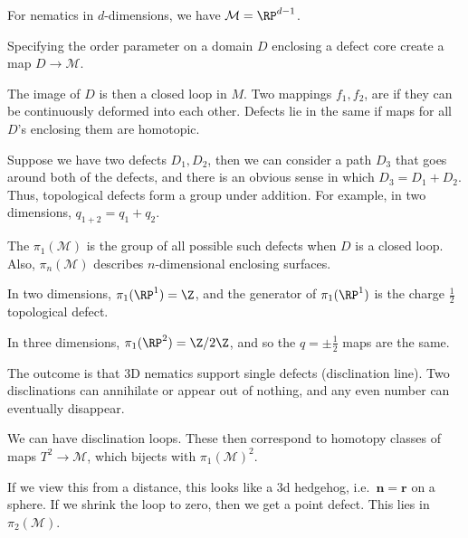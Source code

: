 \documentclass[a4paper]{article}
\begin{document}
\begin{eg}
  For nematics in $d$-dimensions, we have $\mathcal{M} = \RP^{d - 1}$.
\end{eg}

Specifying the order parameter on a domain $D$ enclosing a defect core create a map $D \to \mathcal{M}$.

The image of $D$ is then a closed loop in $M$. Two mappings $f_1, f_2$, are  if they can be continuously deformed into each other. Defects lie in the same  if maps for all $D$'s enclosing them are homotopic.

Suppose we have two defects $D_1, D_2$, then we can consider a path $D_3$ that goes around both of the defects, and there is an obvious sense in which $D_3 = D_1 + D_2$.  Thus, topological defects form a group under addition. For example, in two dimensions, $q_{1 + 2} = q_1 + q_2$.

The  $\pi_1(\mathcal{M})$ is the group of all possible such defects when $D$ is a closed loop. Also, $\pi_n(\mathcal{M})$  describes $n$-dimensional enclosing surfaces.

\begin{eg}
  In two dimensions, $\pi_1(\RP^1) = \Z$, and the generator of $\pi_1(\RP^1)$ is the charge $\frac{1}{2}$ topological defect.
\end{eg}

\begin{eg}
  In three dimensions, $\pi_1(\RP^2) = \Z/2\Z$, and so the $q = \pm \frac{1}{2}$ maps are the same.
\end{eg}

The outcome is that 3D nematics support single defects (disclination line). Two disclinations can annihilate or appear out of nothing, and any even number can eventually disappear.

We can have disclination loops. These then correspond to homotopy classes of maps $T^2 \to \mathcal{M}$, which bijects with $\pi_1(\mathcal{M})^2$.


If we view this from a distance, this looks like a 3d hedgehog, i.e.\ $\mathbf{n} = \mathbf{r}$ on a sphere. If we shrink the loop to zero, then we get a point defect. This lies in $\pi_2(\mathcal{M})$.
\printindex
\end{document}
